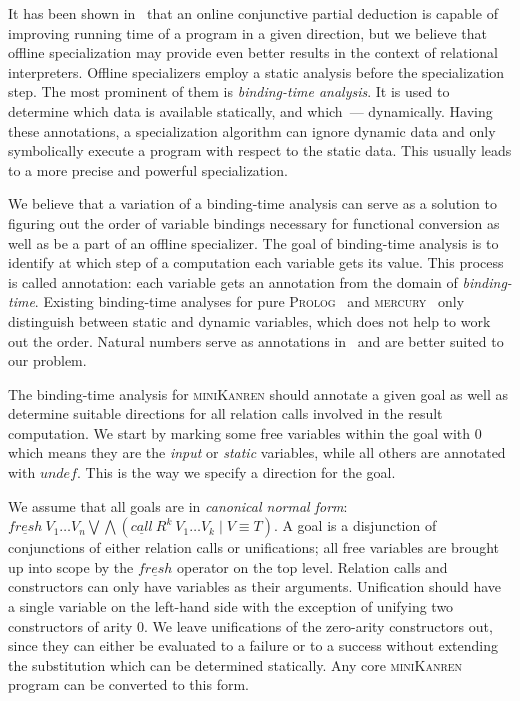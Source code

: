 \documentclass[submission,copyright,creativecommons]{eptcs}
\newcommand{\miniKanren}{\textsc{miniKanren}}
\newcommand{\prolog}{\textsc{Prolog}}
\newcommand{\mercury}{\textsc{mercury}}
\begin{document}
It has been shown in~\cite{lozov2019relational} that an online conjunctive partial deduction is capable of improving running time of a program in a given direction, but we believe that offline specialization may provide even better results in the context of relational interpreters.
Offline specializers employ a static analysis before the specialization step.
The most prominent of them is \emph{binding-time analysis}.
It is used to determine which data is available statically, and which~--- dynamically.
Having these annotations, a specialization algorithm can ignore dynamic data and only symbolically execute a program with respect to the static data.
This usually leads to a more precise and powerful specialization.

We believe that a variation of a binding-time analysis can serve as a solution to figuring out the order of variable bindings necessary for functional conversion as well as be a part of an offline specializer.
The goal of binding-time analysis is to identify at which step of a computation each variable gets its value.
This process is called annotation: each variable gets an annotation from the domain of \emph{binding-time}.
Existing binding-time analyses for pure \prolog{}~\cite{craig2004fully} and \mercury{}~\cite{vanhoof2004binding} only distinguish between static and dynamic variables, which does not help to work out the order.
Natural numbers serve as annotations in~\cite{Thiemann1997AUF} and are better suited to our problem.

The binding-time analysis for \miniKanren{} should annotate a given goal as well as determine suitable directions for all relation calls involved in the result computation.
We start by marking some free variables within the goal with $0$ which means they are the \emph{input} or \emph{static} variables, while all others are annotated with $undef$.
This is the way we specify a direction for the goal.

We assume that all goals are in \emph{canonical normal form}: $\underline{fresh} \ V_1 \dots V_n \bigvee \bigwedge (\underline{call} \ R^k \ V_1 \dots V_k \mid V \equiv T)$. A goal is a disjunction of conjunctions of either relation calls or unifications; all free variables are brought up into scope by the $\underline{fresh}$ operator on the top level. Relation calls and constructors can only have variables as their arguments. Unification should have a single variable on the left-hand side with the exception of unifying two constructors of arity $0$.
We leave unifications of the zero-arity constructors out, since they can either be evaluated to a failure or to a success without extending the substitution which can be determined statically.
Any core \miniKanren{} program can be converted to this form.
\end{document}
